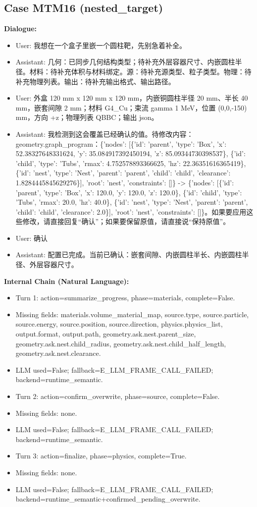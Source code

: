\documentclass[11pt]{ctexart}
\begin{document}
\subsection{Case MTM16 (nested\_target)}
\textbf{Dialogue:}
\begin{itemize}
\item User: 我想在一个盒子里嵌一个圆柱靶，先别急着补全。
\item Assistant: 几何：已同步几何结构类型；待补充外层容器尺寸、内嵌圆柱半径。材料：待补充体积与材料绑定。源：待补充源类型、粒子类型。物理：待补充物理列表。输出：待补充输出格式、输出路径。
\item User: 外盒 120 mm x 120 mm x 120 mm，内嵌铜圆柱半径 20 mm、半长 40 mm，嵌套间隙 2 mm；材料 G4\_Cu；束流 gamma 1 MeV，位置 (0,0,-150) mm，方向 +z；物理列表 QBBC；输出 json。
\item Assistant: 我检测到这会覆盖已经确认的值。待修改内容：geometry.graph\_program：\{'nodes': [\{'id': 'parent', 'type': 'Box', 'x': 52.38327648331624, 'y': 35.084917392450194, 'z': 85.09344730398537\}, \{'id': 'child', 'type': 'Tubs', 'rmax': 4.752578893366625, 'hz': 22.36351616365419\}, \{'id': 'nest', 'type': 'Nest', 'parent': 'parent', 'child': 'child', 'clearance': 1.8284445845629276\}], 'root': 'nest', 'constraints': []\} -> \{'nodes': [\{'id': 'parent', 'type': 'Box', 'x': 120.0, 'y': 120.0, 'z': 120.0\}, \{'id': 'child', 'type': 'Tubs', 'rmax': 20.0, 'hz': 40.0\}, \{'id': 'nest', 'type': 'Nest', 'parent': 'parent', 'child': 'child', 'clearance': 2.0\}], 'root': 'nest', 'constraints': []\}。如果要应用这些修改，请直接回复“确认”；如果要保留原值，请直接说“保持原值”。
\item User: 确认
\item Assistant: 配置已完成。当前已确认：嵌套间隙、内嵌圆柱半长、内嵌圆柱半径、外层容器尺寸。
\end{itemize}
\textbf{Internal Chain (Natural Language):}
\begin{itemize}
\item Turn 1: action=summarize\_progress, phase=materials, complete=False.
\item Missing fields: materials.volume\_material\_map, source.type, source.particle, source.energy, source.position, source.direction, physics.physics\_list, output.format, output.path, geometry.ask.nest.parent\_size, geometry.ask.nest.child\_radius, geometry.ask.nest.child\_half\_length, geometry.ask.nest.clearance.
\item LLM used=False; fallback=E\_LLM\_FRAME\_CALL\_FAILED; backend=runtime\_semantic.
\item Turn 2: action=confirm\_overwrite, phase=source, complete=False.
\item Missing fields: none.
\item LLM used=False; fallback=E\_LLM\_FRAME\_CALL\_FAILED; backend=runtime\_semantic.
\item Turn 3: action=finalize, phase=physics, complete=True.
\item Missing fields: none.
\item LLM used=False; fallback=E\_LLM\_FRAME\_CALL\_FAILED; backend=runtime\_semantic+confirmed\_pending\_overwrite.
\end{itemize}
\end{document}
